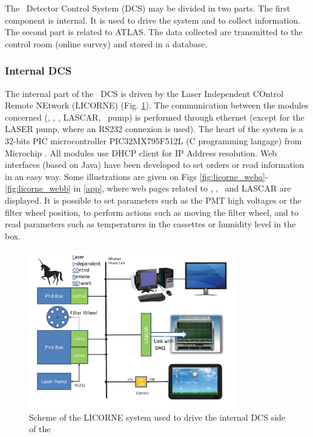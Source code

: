 The \las~Detector Control System (DCS) may be divided in two parts. The first component is internal. It is used to drive the system and to collect information. The second part is related to ATLAS. The data collected are transmitted to the control room (online survey) and stored in a database.

\subsubsection{Internal DCS}

The internal part of the \las~DCS is driven by the Laser Independent COntrol Remote NEtwork (LICORNE) (Fig. \ref{fig:laslicorne}). The communication between the modules concerned (\licmot, \licphd, \licpmt, LASCAR, \laser~pump) is performed through ethernet (except for the LASER pump, where an RS232 connexion is used). The heart of the system is a 32-bits PIC microcontroller PIC32MX795F512L (C programming langage) from Microchip \cite{ref:picmicro}. All modules use DHCP client for IP Address resolution. Web interfaces (based on Java) have been developed to set orders or read information in an easy way. Some illustrations are given on Figs \ref{fig:licorne_weba}-\ref{fig:licorne_webb} in \ref{app}, where web pages related to  \licmot, \licphd, \licpmt~and LASCAR are displayed. It is possible to set parameters such as the PMT high voltages or the filter wheel position, to perform actions such as moving the filter wheel, and to read parameters such as temperatures in the cassettes or humidity level in the \phocal box.


\begin{figure}[htbp]
\centering
\includegraphics[width=9cm]{figures/licorne.pdf}
\caption{Scheme of the LICORNE system used to drive the internal DCS side of the \las}\label{fig:laslicorne}
\end{figure}

